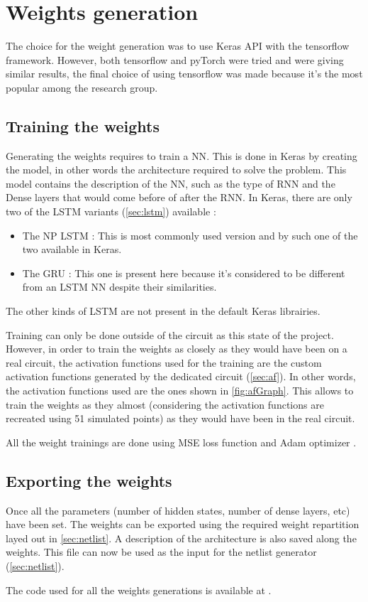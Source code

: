 \section{Weights generation}
\label{sec:genwei}

The choice for the weight generation was to use Keras API with the tensorflow framework. However, both tensorflow and pyTorch were tried and were giving similar results, the final choice of using tensorflow was made because it's the most popular among the research group.%

\subsection{Training the weights}

Generating the weights requires to train a \ac{NN}. This is done in Keras by creating the model, in other words the architecture required to solve the problem. This model contains the description of the \ac{NN}, such as the type of \ac{RNN} and the Dense layers that would come before of after the \ac{RNN}. In Keras, there are only two of the \ac{LSTM} variants (\cref{sec:lstm}) available :

\begin{itemize}
  \item The \ac{NP} \ac{LSTM} : This is most commonly used version and by such one of the two available in Keras.
  \item The \ac{GRU} : This one is present here because it's considered to be different from an \ac{LSTM} \ac{NN} despite their similarities.
\end{itemize}

The other kinds of \ac{LSTM} are not present in the default Keras librairies.

Training can only be done outside of the circuit as this state of the project. However, in order to train the weights as closely as they would have been on a real circuit, the activation functions used for the training are the custom activation functions generated by the dedicated circuit (\cref{sec:af}). In other words, the activation functions used are the ones shown in \cref{fig:afGraph}. This allows to train the weights as they almost (considering the activation functions are recreated using 51 simulated points) as they would have been in the real circuit.

All the weight trainings are done using \ac{MSE} loss function and Adam optimizer \cite{adamOpti}.

\subsection{Exporting the weights}

Once all the parameters (number of hidden states, number of dense layers, etc) have been set. The weights can be exported using the required weight repartition layed out in \cref{sec:netlist}. A description of the architecture is also saved along the weights. This file can now be used as the input for the netlist generator (\cref{sec:netlist}).

The code used for all the weights generations is available at \cite{lstmWei}. %
